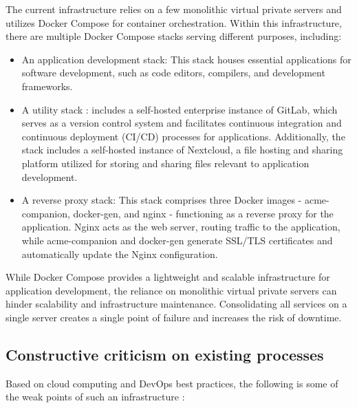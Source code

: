 The current infrastructure relies on a few monolithic virtual private servers and utilizes Docker Compose for container orchestration. Within this infrastructure, there are multiple Docker Compose stacks serving different purposes, including: 
\begin{itemize}[label={--}]
\item An application development stack: This stack houses essential applications for software development, such as code editors, compilers, and development frameworks. 

\item A utility stack : includes a self-hosted enterprise instance of GitLab, which serves as a version control system and facilitates continuous integration and continuous deployment (CI/CD) processes for applications. Additionally, the stack includes a self-hosted instance of Nextcloud, a file hosting and sharing platform utilized for storing and sharing files relevant to application development. 

\item A reverse proxy stack: This stack comprises three Docker images - acme-companion, docker-gen, and nginx - functioning as a reverse proxy for the application. Nginx acts as the web server, routing traffic to the application, while acme-companion and docker-gen generate SSL/TLS certificates and automatically update the Nginx configuration. 
\end{itemize}

While Docker Compose provides a lightweight and scalable infrastructure for application development, the reliance on monolithic virtual private servers can hinder scalability and infrastructure maintenance. Consolidating all services on a single server creates a single point of failure and increases the risk of downtime. 

\subsection{Constructive criticism on existing processes} 

Based on cloud computing and DevOps best practices, the following is some of the weak points of such an infrastructure :

